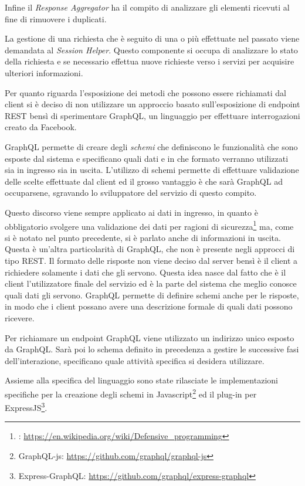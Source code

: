 Infine il \emph{Response Aggregator} ha il compito di analizzare gli elementi ricevuti al fine di rimuovere i duplicati.

La gestione di una richiesta che è seguito di una o più effettuate nel passato viene demandata al \emph{Session Helper}. Questo componente si occupa di analizzare lo stato della richiesta e se necessario effettua nuove richieste verso i servizi per acquisire ulteriori informazioni.

Per quanto riguarda l'esposizione dei metodi che possono essere richiamati dal client si è deciso di non utilizzare un approccio basato sull'esposizione di endpoint REST bensì di sperimentare GraphQL, un linguaggio per effettuare interrogazioni creato da Facebook.

GraphQL permette di creare degli \emph{schemi} che definiscono le funzionalità che sono esposte dal sistema e specificano quali dati e in che formato verranno utilizzati sia in ingresso sia in uscita. L'utilizzo di schemi permette di effettuare validazione delle scelte effettuate dal client ed il grosso vantaggio è che sarà GraphQL ad occuparsene, sgravando lo sviluppatore del servizio di questo compito.

Questo discorso viene sempre applicato ai dati in ingresso, in quanto è obbligatorio svolgere una validazione dei dati per ragioni di sicurezza\footnote{: \url{https://en.wikipedia.org/wiki/Defensive_programming}} ma, come si è notato nel punto precedente, si è parlato anche di informazioni in uscita. Questa è un'altra particolarità di GraphQL, che non è presente negli approcci di tipo REST. Il formato delle risposte non viene deciso dal server bensì è il client a richiedere solamente i dati che gli servono. Questa idea nasce dal fatto che è il client l'utilizzatore finale del servizio ed è la parte del sistema che meglio conosce quali dati gli servono. GraphQL permette di definire schemi anche per le risposte, in modo che i client possano avere una descrizione formale di quali dati possono ricevere.

Per richiamare un endpoint GraphQL viene utilizzato un indirizzo unico esposto da GraphQL. Sarà poi lo schema definito in precedenza a gestire le successive fasi dell'interazione, specificano quale attività specifica si desidera utilizzare.

Assieme alla specifica del linguaggio sono state rilasciate le implementazioni specifiche per la creazione degli schemi in Javascript\footnote{GraphQL-js: \url{https://github.com/graphql/graphql-js}} ed il plug-in per ExpressJS\footnote{Express-GraphQL: \url{https://github.com/graphql/express-graphql}}.

